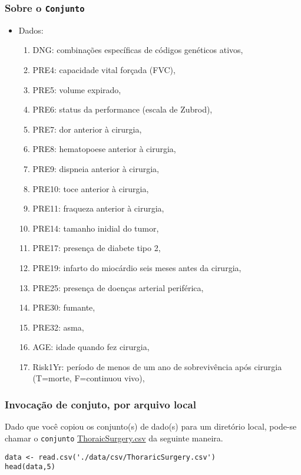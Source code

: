 \documentclass[12pt]{article}
\begin{document}
\subsubsection{Sobre o \texttt{Conjunto}}
\label{sec:orgadf5328}
\begin{itemize}
\item Dados:
\begin{enumerate}
\item DNG: combinações específicas de códigos genéticos ativos,
\item PRE4: capacidade vital forçada (FVC),
\item PRE5: volume expirado,
\item PRE6: status da performance (escala de  Zubrod),
\item PRE7: dor anterior à cirurgia,
\item PRE8: hematopoese anterior à cirurgia,
\item PRE9: dispneia anterior à cirurgia,
\item PRE10: toce anterior à cirurgia,
\item PRE11: fraqueza anterior à cirurgia,
\item PRE14: tamanho inidial do tumor,
\item PRE17: presença de diabete tipo 2,
\item PRE19: infarto do miocárdio seis meses antes da cirurgia,
\item PRE25: presença de doenças arterial periférica,
\item PRE30: fumante,
\item PRE32: asma,
\item AGE: idade quando fez cirurgia,
\item Risk1Yr: período de menos de um ano de sobrevivência após cirurgia (T=morte, F=continuou vivo),
\end{enumerate}
\end{itemize}

\subsubsection{Invocação de conjuto, por arquivo local}
\label{sec:org13134a6}

Dado que você copiou os conjunto(s) de dado(s) para um diretório
local, pode-se chamar o \texttt{conjunto} \href{https://drive.google.com/file/d/13s1ZtCWotN\_VwQb07yTWEyBMmvO042At/view?usp=sharing}{ThoraicSurgery.csv} da seguinte maneira.

\begin{verbatim}
data <- read.csv('./data/csv/ThoraricSurgery.csv')
head(data,5)
\end{verbatim}
\end{document}
